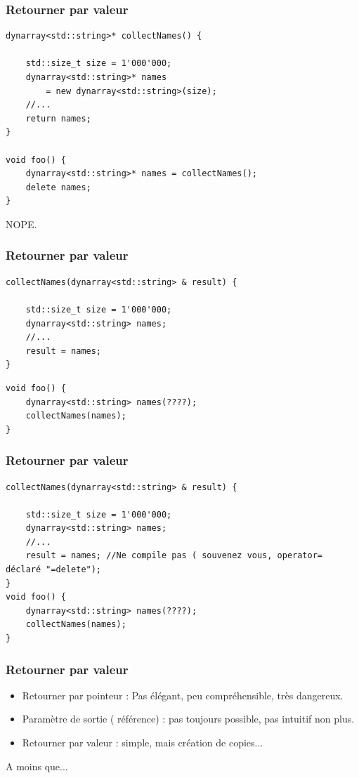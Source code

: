 \documentclass[xetex,mathserif]{beamer}
\begin{document}
\begin{frame}[fragile]
\frametitle{Retourner par valeur}

\begin{lstlisting}[style=badcode]
dynarray<std::string>* collectNames() {
	
    std::size_t size = 1'000'000;
    dynarray<std::string>* names
        = new dynarray<std::string>(size);
    //...
    return names;
}

void foo() {
    dynarray<std::string>* names = collectNames();
    delete names;
}
\end{lstlisting}
\pause
\begin{center}
\huge NOPE.
\end{center}
\end{frame}

\begin{frame}[fragile]
\frametitle{Retourner par valeur}

\begin{lstlisting}[style=badcode]
collectNames(dynarray<std::string> & result) {
	
    std::size_t size = 1'000'000;
    dynarray<std::string> names;
    //...
    result = names;
}
\end{lstlisting}
\pause
\begin{lstlisting}[style=badcode]
void foo() {
    dynarray<std::string> names(????);
    collectNames(names);
}
\end{lstlisting}
\end{frame}


\begin{frame}[fragile]
\frametitle{Retourner par valeur}
\begin{lstlisting}[style=badcode]
collectNames(dynarray<std::string> & result) {
	
    std::size_t size = 1'000'000;
    dynarray<std::string> names;
    //...
    result = names; //Ne compile pas ( souvenez vous, operator=  déclaré "=delete");
}
void foo() {
    dynarray<std::string> names(????);
    collectNames(names);
}
\end{lstlisting}
\end{frame}



\begin{frame}[fragile]
\frametitle{Retourner par valeur}

\begin{itemize} 
	\item Retourner par pointeur : Pas élégant, peu compréhensible, très dangereux.
	\pause
	\item Paramètre de sortie ( référence) : pas toujours possible, pas intuitif non plus.
	\pause
	\item Retourner par valeur : simple, mais création de copies...
\end{itemize}
\pause
A moins que...
\end{frame}
\end{document}
